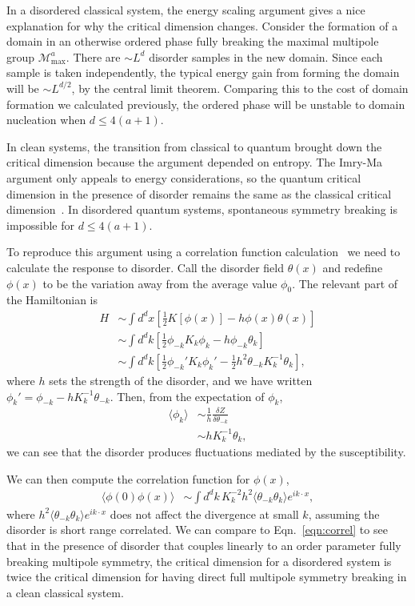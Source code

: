 \documentclass[pra,aps,twocolumn, amsfonts,amsmath,amssymb,nofootinbib,superscriptaddress]{revtex4}
\newcommand{\nn}{\nonumber\\}
\renewcommand{\max}{\text{max}}
\newcommand{\half}{\frac{1}{2}}
\begin{document}
In a disordered classical system, the energy scaling argument gives a nice explanation for why the critical dimension changes. Consider the formation of a domain in an otherwise ordered phase fully breaking the maximal multipole group $\mathcal{M}^a_\max$. There are $\sim L^d$ disorder samples in the new domain. Since each sample is taken independently, the typical energy gain from forming the domain will be $\sim L^{d/2}$, by the central limit theorem. Comparing this to the cost of domain formation we calculated previously, the ordered phase will be unstable to domain nucleation when $d\le 4(a+1)$. 

In clean systems, the transition from classical to quantum brought down the critical dimension because the argument depended on entropy. The Imry-Ma argument only appeals to energy considerations, so the quantum critical dimension in the presence of disorder remains the same as the classical critical dimension~\cite{Vojta2013}. In disordered quantum systems, spontaneous symmetry breaking is impossible for $d\le 4(a+1)$.

To reproduce this argument using a correlation function calculation~\cite{ImryMa} we need to calculate the response to disorder. Call the disorder field $\theta(x)$ and redefine $\phi(x)$ to be the variation away from the average value $\phi_0$. The relevant part of the Hamiltonian is 
\begin{align}
H &\sim \int d^dx \left[ \half K[ \phi(x)] - h \phi(x) \theta(x) \right] \nn
&\sim \int d^dk \left[ \half \phi_{-k} K_k \phi_k -h \phi_{-k} \theta_k \right] \nn
&\sim \int d^dk \left[ \half \phi_{-k}' K_k \phi_k' - \half h^2 \theta_{-k} K^{-1}_k \theta_k \right],
\end{align}
where $h$ sets the strength of the disorder, and we have written $\phi_k' = \phi_{-k} - h K^{-1}_k \theta_{-k}$. Then, from the expectation of $\phi_k$,
\begin{align}
\langle \phi_k \rangle &\sim \frac{1}{h} \frac{\delta Z}{\delta \theta_{-k} } \nn
&\sim h K_k^{-1} \theta_{k},
\end{align}
we can see that the disorder produces fluctuations mediated by the susceptibility.

We can then compute the correlation function for $\phi(x)$,
\begin{align}
\langle \phi(0) \phi(x) \rangle &\sim \int d^dk \, K_k^{-2}  h^2 \langle \theta_{-k} \theta_{k} \rangle e^{ik\cdot x},
\end{align}
where $h^2 \langle \theta_{-k} \theta_{k} \rangle e^{ik\cdot x}$ does not affect the divergence at small $k$, assuming the disorder is short range correlated. We can compare to Eqn.~\ref{eqn:correl} to see that in the presence of disorder that couples linearly to an order parameter fully breaking multipole symmetry, the critical dimension for a disordered system is twice the critical dimension for having direct full multipole symmetry breaking in a clean classical system.
\end{document}
